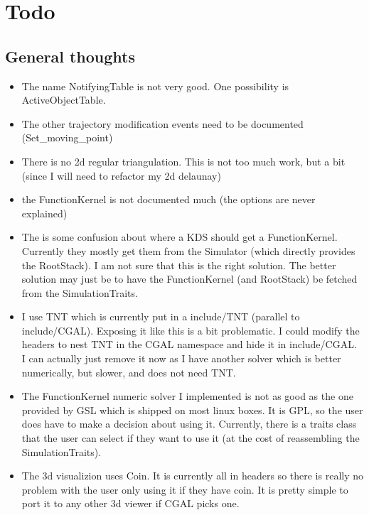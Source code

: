 \section{Todo}

\subsection{General thoughts}

\begin{itemize}

\item The name NotifyingTable is not very good. One possibility is
  ActiveObjectTable.

\item The other trajectory modification events need to be documented
  (Set\_moving\_point)

\item There is no 2d regular triangulation. This is not too much work,
  but a bit (since I will need to refactor my 2d delaunay)

\item the FunctionKernel is not documented much (the options are never
  explained)

\item The is some confusion about where a KDS should get a
  FunctionKernel. Currently they mostly get them from the Simulator
  (which directly provides the RootStack). I am not sure that this is
  the right solution. The better solution may just be to have the
  FunctionKernel (and RootStack) be fetched from the SimulationTraits.

\item I use TNT which is currently put in a include/TNT (parallel to
  include/CGAL). Exposing it like this is a bit problematic. I could
  modify the headers to nest TNT in the CGAL namespace and hide it in
  include/CGAL. I can actually just remove it now as I have another
  solver which is better numerically, but slower, and does not need
  TNT.

\item The FunctionKernel numeric solver I implemented is not as good
  as the one provided by GSL which is shipped on most linux boxes. It
  is GPL, so the user does have to make a decision about using it.
  Currently, there is a traits class that the user can select if they
  want to use it (at the cost of reassembling the SimulationTraits).

\item The 3d visualizion uses Coin. It is currently all in headers so
  there is really no problem with the user only using it if they have
  coin. It is pretty simple to port it to any other 3d viewer if CGAL
  picks one.


\end{itemize}
